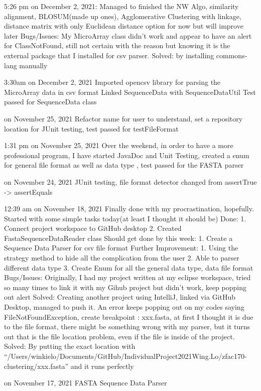\documentclass[]{final_report}
\begin{document}
5:26 pm on December 2, 2021:
Managed to finished the NW Algo, similarity alignment, BLOSUM(made up ones), Agglomerative Clustering with linkage, distance matrix with only Euclidean distance option for now but will improve later Bugs/Issues: My MicroArray class didn’t work and appear to have an alert for ClassNotFound, still not certain with the reason but knowing it is the external package that I installed for csv parser. Solved: by installing commons-lang manually

3:30am on December 2, 2021
Imported opencsv library for parsing the MicroArray data in csv format Linked SequenceData with SequenceDataUtil Test passed for SequenceData class

on November 25, 2021
Refactor name for user to understand, set a repository location for JUnit testing, test passed for testFileFormat

1:31 pm on November 25, 2021 
Over the weekend, in order to have a more professional program, I have started JavaDoc and Unit Testing, created a enum for general file format as well as data type , test passed for the FASTA parser

on November 24, 2021
JUnit testing, file format detector changed from assertTrue -> assertEquals

12:39 am on November 18, 2021 
Finally done with my procrastination, hopefully. Started with some simple tasks today(at least I thought it should be) Done: 1. Connect project workspace to GitHub desktop 2. Created FastaSequenceDataReader class Should get done by this week: 1. Create a Sequence Data Parser for csv file format Further Improvement: 1. Using the strategy method to hide all the complication from the user 2. Able to parser different data type 3. Create Enum for all the general data type, data file format Bugs/Issues: Originally, I had my project written at my eclipse workspace, tried so many times to link it with my Gihub project but didn’t work, keep popping out alert Solved: Creating another project using IntelliJ, linked via GitHub Desktop, managed to push it. An error keeps popping out on my codes saying FileNotFoundException, create breakpoint : xxx.fasta, at first I thought it is due to the file format, there might be something wrong with my parser, but it turns out that is the file location problem, even if the file is inside of the project. Solved: By putting the exact location with “/Users/winkielo/Documents/GitHub/IndividualProject2021Wing.Lo/zfac170-clustering/xxx.fasta” and it runs perfectly

on November 17, 2021
FASTA Sequence Data Parser
\end{document}
